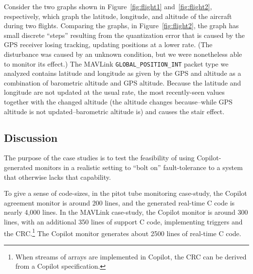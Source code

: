\noindent
Consider the two graphs shown in Figure~\ref{fig:flight1}
and~\ref{fig:flight2}, respectively, which graph the latitude, longitude, and
altitude of the aircraft during two flights.  Comparing the graphs, in
Figure~\ref{fig:flight2}, the graph has small discrete ``steps'' resulting from
the quantization error that is caused by the GPS receiver losing tracking,
updating positions at a lower rate.  (The disturbance was caused by an unknown
condition, but we were nonetheless able to monitor its effect.)  The MAVLink
{\small \tt GLOBAL\_POSITION\_INT} packet type we analyzed contains latitude and
longitude as given by the GPS and altitude as a combination of barometric
altitude and GPS altitude.  Because the latitude and longitude are not updated
at the usual rate, the most recently-seen values together with the changed
altitude (the altitude changes because--while GPS altitude is not
updated--barometric altitude is) and causes the stair effect.


\subsection{Discussion}
The purpose of the case studies is to test the feasibility of using
Copilot-generated monitors in a realistic setting to ``bolt on'' fault-tolerance
to a system that otherwise lacks that capability.  

To give a sense of code-sizes, in the pitot tube monitoring case-study, the
Copilot agreement monitor is around 200 lines, and the generated real-time C
code is nearly 4,000 lines.  In the MAVLink case-study, the Copilot monitor is
around 300 lines, with an additional 350 lines of support C code, implementing
triggers and the CRC.\footnote{When streams of arrays are implemented in
  Copilot, the CRC can be derived from a Copilot specification.}  The Copilot
monitor generates about 2500 lines of real-time C code.





